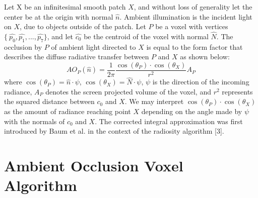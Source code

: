 \documentclass{amsart}
\begin{document}
Let X be an infinitesimal smooth patch $X$, and without loss of generality let the center be at the origin with normal $\hat{n}$. Ambient illumination is the incident light on $X$, due to objects outside of the patch.  Let $P$ be a voxel with vertices $\{\ \hat{p_0}, \hat{p_1} , ..., \hat{p_7}\}$, and let $\hat{c_0}$ be the centroid of the voxel with normal $\hat{N}$. The occlusion by $P$ of ambient light directed to $X$ is equal to the form factor that describes the diffuse radiative transfer between $P$ and $X$ as shown below:
\[ AO_P (\hat{n}) = \frac{1}{2\pi} \frac{\cos(\theta_P) \cdot \cos(\theta_X)}{r^2} A_P\]
where $\cos(\theta_P) = \hat{n} \cdot \psi$, $\cos(\theta_X) = \hat{N} \cdot \psi$, $\psi$ is the direction of the incoming radiance, $A_P$ denotes the screen projected volume of the voxel, and $r^2$ represents the squared distance between $c_0$ and $X$. We may interpret $\cos(\theta_P) \cdot \cos(\theta_X)$ as the amount of radiance reaching point $X$ depending on the angle made by $\psi$ with the normals of $c_0$ and $X$. The corrected integral approximation was first introduced by Baum et al. in the context of the radiosity algorithm [3].
\indent{}

\vspace{2mm}

\section{Ambient Occlusion Voxel Algorithm}

\end{document}
